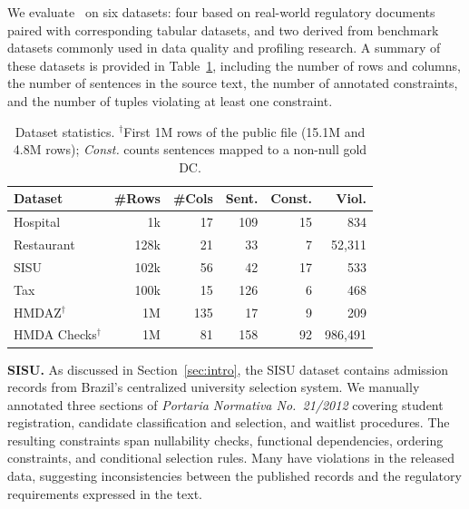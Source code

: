 We evaluate \system\ on six datasets: four based on real-world regulatory documents paired with corresponding tabular datasets, and two derived from benchmark datasets commonly used in data quality and profiling research. A summary of these datasets is provided in Table~\ref{tab:datasets}, including the number of rows and columns, the number of sentences in the source text, the number of annotated constraints, and the number of tuples violating at least one constraint.



\begin{table}[ht]
  \centering
\small
  \begin{tabular}{lrrrrr}
    \toprule
    \textbf{Dataset} & \textbf{\#Rows} & \textbf{\#Cols} & \textbf{Sent.} & \textbf{Const.} & \textbf{Viol.} \\
    \midrule
    Hospital & 1k & 17 & 109 & 15 & 834 \\
    Restaurant & 128k & 21 & 33 & 7 & 52,311 \\
    SISU & 102k & 56 & 42 & 17 & 533 \\
    Tax & 100k & 15 & 126 & 6 & 468 \\
    HMDAZ$^{\dagger}$ & 1M & 135 & 17 & 9 & 209 \\
    HMDA Checks$^{\dagger}$ & 1M & 81 & 158 & 92 & 986,491 \\
    \bottomrule
  \end{tabular}%
    \caption{Dataset statistics. $^{\dagger}$First 1M rows of the public file (15.1M and 4.8M rows); \emph{Const.} counts sentences mapped to a non-null gold DC.}
  \label{tab:datasets}
\end{table}

\smallskip\noindent\textbf{SISU.}
As discussed in Section~\ref{sec:intro}, the SISU dataset contains admission
records from Brazil's centralized university selection system. We manually
annotated three sections of \textit{Portaria Normativa No.~21/2012} covering student
registration, candidate classification and selection, and waitlist procedures.
The resulting constraints span nullability checks, functional dependencies,
ordering constraints, and conditional selection rules. Many have violations in
the released data, suggesting inconsistencies between the published records and
the regulatory requirements expressed in the text.

